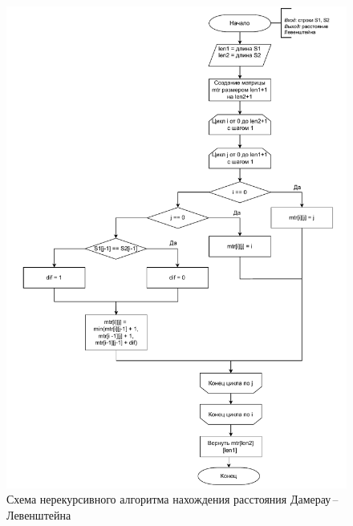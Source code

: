 \begin{figure}[h]
	\centering
	\includegraphics[height=0.9\textheight, page=2]{img/algorithms.pdf}
	\caption{Схема нерекурсивного алгоритма нахождения расстояния Дамерау\,--\,Левенштейна}
	\label{fig:DLiter}
\end{figure}

\clearpage

